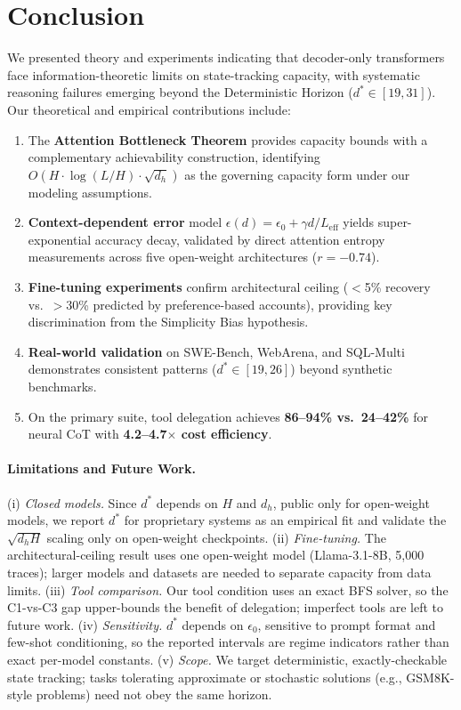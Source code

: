 \documentclass{article}
\theoremstyle{plain}
\theoremstyle{definition}
\theoremstyle{remark}
\newcommand{\Leff}{L_{\mathrm{eff}}}
\begin{document}

\section{Conclusion}
\label{sec:conclusion}

We presented theory and experiments indicating that decoder-only transformers face information-theoretic limits on state-tracking capacity, with systematic reasoning failures emerging beyond the Deterministic Horizon ($d^* \in [19, 31]$). Our theoretical and empirical contributions include:

\begin{enumerate}[leftmargin=*,itemsep=1pt]
	\item The \textbf{Attention Bottleneck Theorem} provides capacity bounds with a complementary achievability construction, identifying $O(H \cdot \log(L/H) \cdot \sqrt{d_h})$ as the governing capacity form under our modeling assumptions.
	\item \textbf{Context-dependent error} model $\epsilon(d) = \epsilon_0 + \gamma d/\Leff$ yields super-exponential accuracy decay, validated by direct attention entropy measurements across five open-weight architectures ($r = -0.74$).
	\item \textbf{Fine-tuning experiments} confirm architectural ceiling ($<$5\% recovery vs.\ $>$30\% predicted by preference-based accounts), providing key discrimination from the Simplicity Bias hypothesis.
	\item \textbf{Real-world validation} on SWE-Bench, WebArena, and SQL-Multi demonstrates consistent patterns ($d^* \in [19, 26]$) beyond synthetic benchmarks.
	\item On the primary suite, tool delegation achieves \textbf{86--94\% vs.\ 24--42\%} for neural CoT with \textbf{4.2--4.7$\times$ cost efficiency}.
\end{enumerate}

\paragraph{Limitations and Future Work.} (i) \emph{Closed models.} Since $d^*$ depends on $H$ and $d_h$, public only for open-weight models, we report $d^*$ for proprietary systems as an empirical fit and validate the $\sqrt{d_h H}$ scaling only on open-weight checkpoints. (ii) \emph{Fine-tuning.} The architectural-ceiling result uses one open-weight model (Llama-3.1-8B, 5{,}000 traces); larger models and datasets are needed to separate capacity from data limits. (iii) \emph{Tool comparison.} Our tool condition uses an exact BFS solver, so the C1-vs-C3 gap upper-bounds the benefit of delegation; imperfect tools are left to future work. (iv) \emph{Sensitivity.} $d^*$ depends on $\epsilon_0$, sensitive to prompt format and few-shot conditioning, so the reported intervals are regime indicators rather than exact per-model constants. (v) \emph{Scope.} We target deterministic, exactly-checkable state tracking; tasks tolerating approximate or stochastic solutions (e.g., GSM8K-style problems) need not obey the same horizon.
\end{document}
